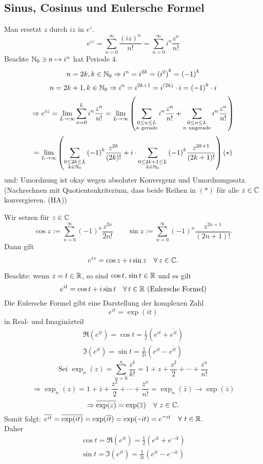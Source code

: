 \documentclass[../ana1.tex]{subfiles}
\begin{document}
\subsection*{Sinus, Cosinus und Eulersche Formel}
Man ersetzt \( z \) durch \( iz \) in \( e^z \).
\[ e^{iz} = \sum_{n=0}^{\infty} \frac{{(iz)}^n}{n!} = \sum_{n=0}^{\infty} i^n \frac{z^n}{n!} \]
Beachte \( \mathbb{N}_0 \ni n \mapsto i^n \) hat Periode \( 4 \).
\[ n = 2k, k\in\mathbb{N}_0 \Rightarrow i^n = i^{2k} = {(i^2)}^k = {(-1)}^k \]
\[ n = 2k+1, k\in\mathbb{N}_0 \Rightarrow i^n = i^{2k+1} = i^{(2k)} \cdot i = {(-1)}^k \cdot i \]
\[ \Rightarrow e^{iz} = \lim\limits_{L\rightarrow\infty} \sum_{n=0}^L i^n \frac{z^n}{n!} = \lim\limits_{L\rightarrow\infty} \left( \sum_{\substack{0\leq n \leq L\\ n\text{ gerade}}} i^n \frac{z^n}{n!} + \sum_{\substack{0 \leq n \leq L\\ n\text{ ungerade}}} i^n \frac{z^n}{n!} \right) \]
\[ = \lim\limits_{L\rightarrow\infty} \left( \sum_{\substack{0\leq 2k \leq L\\ k\in\mathbb{N}_0}} {(-1)}^k \frac{z^{2k}}{(2k)!} + i \cdot \sum_{\substack{0\leq 2k+1 \leq L\\ k\in\mathbb{N}_0 }} {(-1)}^k \frac{z^{2k+1}}{(2k+1)!} \right) (*) \]
und: Umordnung ist okay wegen absoluter Konvergenz und Umordnungssatz.\\
(Nachrechnen mit Quotientenkriterium, dass beide Reihen in \( (*) \) für alle \( z\in\mathbb{C} \) konvergieren. (HA))
\begin{defi}
    Wir setzen für \( z\in\mathbb{C} \)
    \[ \cos z := \sum_{n=0}^\infty {(-1)}^n \frac{z^{2n}}{2n!} \qquad \sin z  := \sum_{n=0}^\infty {(-1)}^n \frac{z^{2n+1}}{(2n+1)!}. \]
    Dann gilt
    \[ e^{iz} = \cos z + i \sin z \quad \forall z\in\C. \]
\end{defi}
\begin{prosa}
    Beachte: wenn \( z=t\in\mathbb{R} \), so sind \( \cos t,\, \sin t \in\mathbb{R} \) und es gilt
    \[ e^{it} = \cos t + i \sin t \quad \forall t\in\R \text{ (Eulersche Formel)} \]
    Die Eulersche Formel gibt eine Darstellung der komplexen Zahl
    \[ e^{it} = \exp(it) \]
    in Real- und Imaginärteil
    \begin{align*}
        \Re (e^{it}) = \cos t = \frac{1}{2} (e^{it} + \overline{e^{it}})\\
        \Im (e^{it}) = \sin t = \frac{1}{2i} (e^{it} - \overline{e^{it}})
    \end{align*}
    \[ \text{Sei } \exp_n (z) = \sum_{n=0}^n \frac{z^k}{k!} = 1 + z + \frac{z^2}{2} + \cdots + \frac{z^n}{n!} \]
    \[ \Rightarrow \overline{\exp_n(z)} = 1 + \overline{z} + \frac{ \overline{z}^2 }{2} + \cdots + \frac{ \overline{z}^n }{n!} = \exp_n (\overline{z}) \rightarrow \exp(\overline{z}) \]
    \[ \Rightarrow \overline{\exp(z)} = \exp(\overline{z}) \quad \forall \, z\in\C. \]
    Somit folgt: \( \overline{e^{it}} = \overline{\exp(it)} = \exp(\overline{it}) = \exp(\minus it) = e^{\minus i t} \quad \forall \, t\in\R \).\\
    Daher 
    \begin{align*}
        \cos t = \Re(e^{it}) = \frac{1}{2} \left( e^{it} + e^{\minus it} \right) \\
        \sin t = \Im(e^{it}) = \frac{1}{2i} \left( e^{it} - e^{\minus it} \right)
    \end{align*}
\end{prosa}
\end{document}
